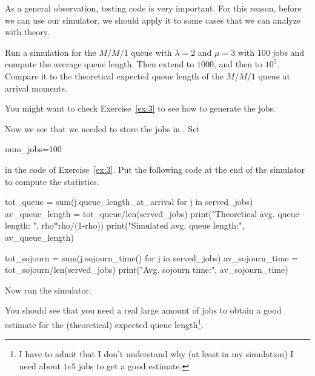 As a general observation, testing code is very important. For this reason, before we can use our simulator, we should apply it to some cases that we can analyze with theory. 

\begin{exercise}
  Run a simulation for the $M/M/1$ queue with $\lambda=2$ and $\mu=3$ with 100 jobs and compute the average queue length. Then extend to $1000$, and then to $10^5$. Compare it to the theoretical expected queue length of the $M/M/1$ queue at arrival moments.

  \begin{hint}
You might want to check Exercise~\ref{ex:3} to see how to generate the jobs.
    \end{hint}
  \begin{solution}
    Now we see that we needed to store the jobs in . Set
    \begin{pyverbatim}
    num_jobs=100      
    \end{pyverbatim}
in the code of Exercise~\ref{ex:3}. Put the following code at the end of the simulator to compute the statistics. 
    \begin{pyverbatim}

tot_queue = sum(j.queue_length_at_arrival for j in served_jobs)
av_queue_length = tot_queue/len(served_jobs)
print("Theoretical avg. queue length: ", rho*rho/(1-rho))
print("Simulated avg. queue length:", av_queue_length)
      
tot_sojourn = sum(j.sojourn_time() for j in served_jobs)
av_sojourn_time = tot_sojourn/len(served_jobs)
print("Avg. sojourn time:", av_sojourn_time)
\end{pyverbatim}

Now run the simulator.

You should see that you need a real large amount of jobs to obtain a good estimate for the (theoretical) expected queue length\footnote{I have to admit that I don't understand why (at least in my simulation) I need about $1e5$ jobs to get a good estimate.}. 

  \end{solution}
\end{exercise}


